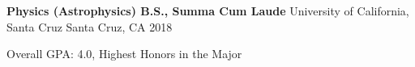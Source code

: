 \begin{cventries}
  \cventry
    {\textbf{Physics (Astrophysics) B.S., Summa Cum Laude}}
    {University of California, Santa Cruz}
    {Santa Cruz, CA}
    {2018}
    {
      \vspace{1mm}
      \begin{cvitems}
       \item {Overall GPA: 4.0, Highest Honors in the Major}
      \end{cvitems}
    }

\end{cventries}

